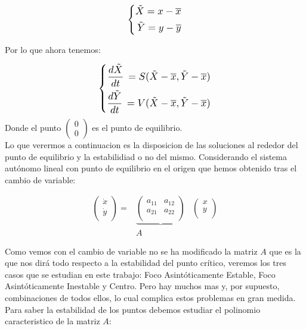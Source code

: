 \documentclass[12pt,a4paper]{report} %
\begin{document}
	\begin{equation}
		\label{eq:trans}
		\scalebox{1.2}{$\displaystyle
			\left\{
			\begin{aligned}
				\tilde{X}=x-\overline{x} \\
				\tilde{Y}=y-\overline{y}
			\end{aligned}
			\right.
			$}
	\end{equation}\smallskip
	
	Por lo que ahora tenemos:
	
	\begin{equation}
		\label{eq:trans2}
		\scalebox{1.2}{$\displaystyle
			\left\{
			\begin{aligned}
				\frac{d\tilde{X}}{dt}\,=S(\tilde{X}-\overline{x},\tilde{Y}-\overline{x}) \\
				\frac{d\tilde{Y}}{dt}\,=V(\tilde{X}-\overline{x},\tilde{Y}-\overline{x})
			\end{aligned}
			\right.
			$}
	\end{equation}\smallskip
	Donde el punto $\begin{pmatrix} 0 \\ 0 \end{pmatrix}$ es el punto de equilibrio. \\[0.5cm]
	Lo que verermos a continuacion es la disposicion de las soluciones al rededor del punto de equilibrio y la estabilidiad o no del mismo. Considerando el sistema autónomo lineal con punto de equilibrio en el origen que hemos obtenido tras el cambio de variable:
	
	\begin{eqnarray}
		\label{eq:trans3}
			\begin{pmatrix}
				\dot{x}\\
				\dot{y}\\
			\end{pmatrix} =
			&\underbrace{\begin{pmatrix}
				a_{11} & a_{12}\\
				a_{21} & a_{22}\\
			\end{pmatrix}}&
			\begin{pmatrix}
				x\\
				y\\
			\end{pmatrix} \nonumber \\[1mm]
			&A&
	\end{eqnarray} \smallskip
	
	Como vemos con el cambio de variable no se ha modificado la matriz $A$ que es la que nos dirá todo respecto a la estabilidad del punto crítico, veremos los tres casos que se estudian en este trabajo: Foco Asintóticamente Estable, Foco Asintóticamente Inestable y Centro. Pero hay muchos mas y, por supuesto, combinaciones de todos ellos, lo cual complica estos problemas en gran medida.\\[0.5cm]
	Para saber la estabilidad de los puntos debemos estudiar el polinomio caracteristico de la matriz $A$:
	
\end{document}
